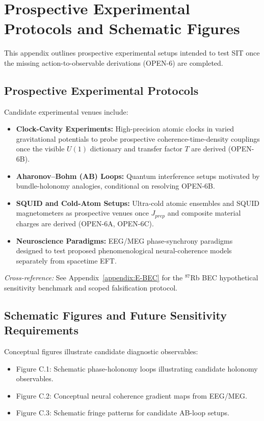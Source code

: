 \documentclass[american,11pt,letterpaper]{article}
\def\mathcal#1{#1}%
\def\mathrm#1{#1}%
\def\texttt#1{#1}%
\begin{document}
\section{Prospective Experimental Protocols and Schematic Figures}
\label{appendix:C}

This appendix outlines prospective experimental setups intended to test SIT once the missing action-to-observable derivations (\texttt{OPEN-6}) are completed.

\subsection{Prospective Experimental Protocols}

Candidate experimental venues include:

\begin{itemize}
    \item \textbf{Clock-Cavity Experiments:} High-precision atomic clocks in varied gravitational potentials to probe prospective coherence-time-density couplings once the visible $U(1)$ dictionary and transfer factor $\mathcal{T}$ are derived (\texttt{OPEN-6B}).
    \item \textbf{Aharonov--Bohm (AB) Loops:} Quantum interference setups motivated by bundle-holonomy analogies, conditional on resolving \texttt{OPEN-6B}.
    \item \textbf{SQUID and Cold-Atom Setups:} Ultra-cold atomic ensembles and SQUID magnetometers as prospective venues once $J_{\mathrm{prep}}$ and composite material charges are derived (\texttt{OPEN-6A}, \texttt{OPEN-6C}).
    \item \textbf{Neuroscience Paradigms:} EEG/MEG phase-synchrony paradigms designed to test proposed phenomenological neural-coherence models separately from spacetime EFT.
\end{itemize}

\noindent\textit{Cross-reference:} See Appendix~\ref{appendix:E-BEC} for the $^{87}$Rb BEC hypothetical sensitivity benchmark and scoped falsification protocol.

\subsection{Schematic Figures and Future Sensitivity Requirements}

Conceptual figures illustrate candidate diagnostic observables:

\begin{itemize}
    \item Figure C.1: Schematic phase-holonomy loops illustrating candidate holonomy observables.
    \item Figure C.2: Conceptual neural coherence gradient maps from EEG/MEG.
    \item Figure C.3: Schematic fringe patterns for candidate AB-loop setups.
\end{itemize}
\end{document}
